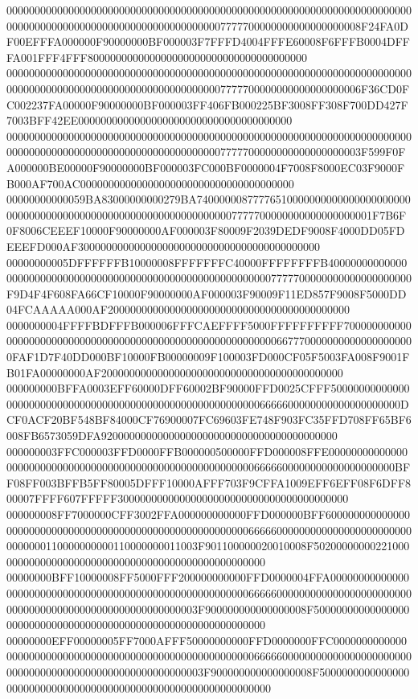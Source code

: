 000000000000000000000000000000000000000000000000000000000000000000000000000000000000000000000000000000000000007777700000000000000000008F24FA0DF00EFFFA000000F90000000BF000003F7FFFD4004FFFE60008F6FFFB0004DFFFA001FFF4FFF800000000000000000000000000000000000000
000000000000000000000000000000000000000000000000000000000000000000000000000000000000000000000000000000000000007777700000000000000000006F36CD0FC002237FA00000F90000000BF000003FF406FB000225BF3008FF308F700DD427F7003BFF42EE00000000000000000000000000000000000000
000000000000000000000000000000000000000000000000000000000000000000000000000000000000000000000000000000000000007777700000000000000000003F599F0FA000000BE00000F90000000BF000003FC000BF0000004F7008F8000EC03F9000FB000AF700AC00000000000000000000000000000000000000
00000000000059BA83000000000279BA7400000087777651000000000000000000000000000000000000000000000000000000000000007777700000000000000000001F7B6F0F8006CEEEF10000F90000000AF000003F80009F2039DEDF9008F4000DD05FDEEEFD000AF3000000000000000000000000000000000000000000
00000000005DFFFFFFB10000008FFFFFFFC40000FFFFFFFFB40000000000000000000000000000000000000000000000000000000000007777700000000000000000000F9D4F4F608FA66CF10000F90000000AF000003F90009F11ED857F9008F5000DD04FCAAAAA000AF2000000000000000000000000000000000000000000
0000000004FFFFBDFFFB000006FFFCAEFFFF5000FFFFFFFFFF7000000000000000000000000000000000000000000000000000000000006677700000000000000000000FAF1D7F40DD000BF10000FB00000009F100003FD000CF05F5003FA008F9001FB01FA00000000AF2000000000000000000000000000000000000000000
000000000BFFA0003EFF60000DFF60002BF90000FFD0025CFFF500000000000000000000000000000000000000000000000000000000006666600000000000000000000DCF0ACF20BF548BF84000CF76900007FC69603FE748F903FC35FFD708FF65BF6008FB6573059DFA920000000000000000000000000000000000000000
000000003FFC000003FFD0000FFB000000500000FFD000008FFE00000000000000000000000000000000000000000000000000000000006666600000000000000000000BFF08FF003BFFB5FF80005DFFF10000AFFF703F9CFFA1009EFF6EFF08F6DFF800007FFFF607FFFFF30000000000000000000000000000000000000000
000000008FF7000000CFF3002FFA000000000000FFD000000BFF6000000000000000000000000000000000000000000000000000000000666660000000000000000000000000000000110000000000110000000011003F901100000020010008F502000000002210000000000000000000000000000000000000000000000000
00000000BFF10000008FF5000FFF200000000000FFD0000004FFA000000000000000000000000000000000000000000000000000000000666660000000000000000000000000000000000000000000000000000000003F900000000000000008F500000000000000000000000000000000000000000000000000000000000000
00000000EFF00000005FF7000AFFF50000000000FFD0000000FFC000000000000000000000000000000000000000000000000000000000666660000000000000000000000000000000000000000000000000000000003F900000000000000008F500000000000000000000000000000000000000000000000000000000000000
